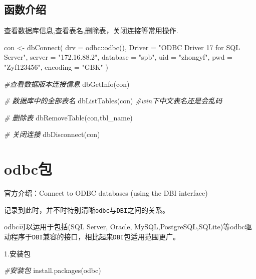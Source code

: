 \documentclass[
]{book}
\newenvironment{Shaded}{\begin{snugshade}}{\end{snugshade}}
\newcommand{\AttributeTok}[1]{\textcolor[rgb]{0.77,0.63,0.00}{#1}}
\newcommand{\CommentTok}[1]{\textcolor[rgb]{0.56,0.35,0.01}{\textit{#1}}}
\newcommand{\FunctionTok}[1]{\textcolor[rgb]{0.00,0.00,0.00}{#1}}
\newcommand{\NormalTok}[1]{#1}
\newcommand{\OtherTok}[1]{\textcolor[rgb]{0.56,0.35,0.01}{#1}}
\newcommand{\SpecialCharTok}[1]{\textcolor[rgb]{0.00,0.00,0.00}{#1}}
\newcommand{\StringTok}[1]{\textcolor[rgb]{0.31,0.60,0.02}{#1}}
\begin{document}
\hypertarget{ux51fdux6570ux4ecbux7ecd}{%
\subsection{函数介绍}\label{ux51fdux6570ux4ecbux7ecd}}

查看数据库信息,查看表名,删除表，关闭连接等常用操作.

\begin{Shaded}
\begin{Highlighting}[]
\NormalTok{con }\OtherTok{\textless{}{-}} \FunctionTok{dbConnect}\NormalTok{(}
  \AttributeTok{drv =}\NormalTok{ odbc}\SpecialCharTok{::}\FunctionTok{odbc}\NormalTok{(),}
  \AttributeTok{Driver =} \StringTok{"ODBC Driver 17 for SQL Server"}\NormalTok{, }\AttributeTok{server =} \StringTok{"172.16.88.2"}\NormalTok{, }
  \AttributeTok{database =} \StringTok{"spb"}\NormalTok{, }\AttributeTok{uid =} \StringTok{"zhongyf"}\NormalTok{, }\AttributeTok{pwd =} \StringTok{"Zyf123456"}\NormalTok{, }\AttributeTok{encoding =} \StringTok{"GBK"}
\NormalTok{)}

\CommentTok{\#查看数据版本连接信息}
\FunctionTok{dbGetInfo}\NormalTok{(con)}

\CommentTok{\# 数据库中的全部表名}
\FunctionTok{dbListTables}\NormalTok{(con) }\CommentTok{\#win下中文表名还是会乱码}

\CommentTok{\# 删除表}
\FunctionTok{dbRemoveTable}\NormalTok{(con,}\StringTok{\textquotesingle{}tbl\_name\textquotesingle{}}\NormalTok{)}

\CommentTok{\# 关闭连接}
\FunctionTok{dbDisconnect}\NormalTok{(con)}
\end{Highlighting}
\end{Shaded}

\hypertarget{odbcux5305}{%
\section{odbc包}\label{odbcux5305}}

官方介绍：Connect to ODBC databases (using the DBI interface)

记录到此时，并不时特别清晰\texttt{odbc}与\texttt{DBI}之间的关系。

odbc可以运用于包括(SQL Server, Oracle, MySQL,PostgreSQL,SQLite)等odbc驱动程序于\texttt{DBI}兼容的接口，相比起来\texttt{DBI}包适用范围更广。

1.安装包

\begin{Shaded}
\begin{Highlighting}[]
\CommentTok{\#安装包}
\FunctionTok{install.packages}\NormalTok{(}\StringTok{\textquotesingle{}odbc\textquotesingle{}}\NormalTok{)}
\end{Highlighting}
\end{Shaded}
\end{document}
